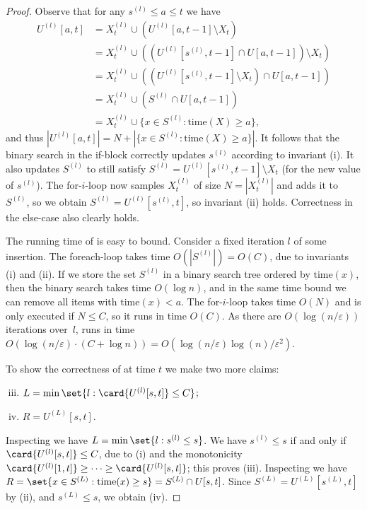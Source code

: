 \documentclass[a4paper, 11pt]{article}
\newcommand{\eps}{\varepsilon}
\begin{document}
\begin{proof}
    Observe that for any $s^{(l)} \le a \le t$ we have
    \begin{align*}
        U^{(l)}[a,t]
        &= X_t^{(l)} \cup (U^{(l)}[a, t-1] \setminus X_t) \\
        &= X_t^{(l)} \cup ((U^{(l)}[s^{(l)}, t-1] \cap U[a, t-1]) \setminus X_t) \\
        &= X_t^{(l)} \cup ((U^{(l)}[s^{(l)}, t-1] \setminus X_t) \cap U[a, t-1]) \\
        &= X_t^{(l)} \cup (S^{(l)} \cap U[a,t-1])  \\
        &= X_t^{(l)} \cup \{x \in S^{(l)} \colon \mathrm{time}(X) \ge a \},
    \end{align*}
    and thus $|U^{(l)}[a,t]| = N + |\{x \in S^{(l)} \colon \mathrm{time}(X) \ge a \}|$. It follows that the binary search in the if-block correctly updates $s^{(l)}$ according to invariant (i). It also updates $S^{(l)}$ to still satisfy $S^{(l)} = U^{(l)}[s^{(l)}, t-1] \setminus X_t$ (for the new value of $s^{(l)}$). The for-$i$-loop now samples $X_t^{(l)}$ of size $N = |X_t^{(l)}|$ and adds it to $S^{(l)}$, so we obtain $S^{(l)} = U^{(l)}[s^{(l)}, t]$, so invariant (ii) holds. Correctness in the else-case also clearly holds.

    The running time of \ins is easy to bound.
    Consider a fixed iteration $l$ of some insertion. The foreach-loop takes time $O(|S^{(l)}|) = O(C)$, due to invariants (i) and (ii). 
    If we store the set $S^{(l)}$ in a binary search tree ordered by $\mathrm{time}(x)$, then the binary search takes time $O(\log n)$, and in the same time bound we can remove all items with $\mathrm{time}(x) < a$.
    The for-$i$-loop takes time $O(N)$ and is only executed if $N \le C$, so it runs in time $O(C)$.
    As there are $O(\log(n/\eps))$ iterations over~$l$, \ins runs in time $O(\log(n/\eps) \cdot (C + \log n)) = O(\log(n/\eps) \log(n)/\eps^2)$.

    \smallskip
    To show the correctness of  at time $t$ we make two more claims:
    \begin{enumerate}[(i)]
        \setcounter{enumi}{2}
        \item $L = \min \set{ l : \card{U^{(l)}[s,t]} \leq C }$;
        \item $R = U^{(L)}[s,t]$.
    \end{enumerate}
    Inspecting  we have $L = \min \set{l : s^{(l)} \leq s}$. We have $s^{(l)} \leq s$ if and only if $\card{U^{(l)}[s,t]} \leq C$, due to (i) and the monotonicity $\card{U^{(l)}[1,t]} \geq \cdots \geq \card{U^{(l)}[s,t]}$; this proves (iii). Inspecting  we have $R = \set{x \in S^{(L)} : \mathrm{time}(x) \geq s } = S^{(L)} \cap U[s,t]$. Since $S^{(L)} = U^{(L)}[s^{(L)},t]$ by (ii), and $s^{(L)} \leq s$, we obtain (iv).
    

\end{proof}
\end{document}
